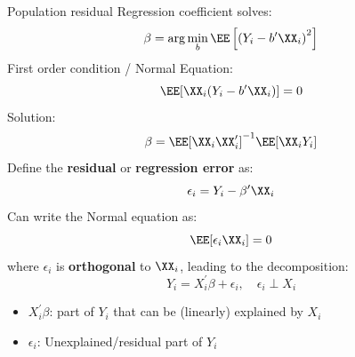 \documentclass[compress, 8pt]{beamer}
\begin{document}
\begin{frame}{Population residual}
Regression coefficient solves:
\begin{equation*}
    \beta = \arg \min_b \EE \left[ \left(Y_i - b^\prime \XX_i\right)^2 \right]
\end{equation*}
First order condition / Normal Equation:
\begin{equation*}
    \EE [\XX_i (Y_i - b^\prime \XX_i)] = 0
\end{equation*}
Solution:
\begin{equation*}
    \beta = \EE [\XX_i \XX_i^\prime]^{-1} \EE [\XX_i Y_i]
\end{equation*}
Define the \textbf{residual} or \textbf{regression error} as:
\begin{equation*}
    \epsilon_i = Y_i - \beta^\prime \XX_i
\end{equation*}
Can write the Normal equation as:
\begin{equation*}
    \EE [ \epsilon_i \XX_i ] = 0
\end{equation*}
where $\epsilon_i$ is \textbf{orthogonal} to $\XX_i$, leading to the decomposition:
\begin{equation*}
    Y_i = X_i^\prime \beta + \epsilon_i, \quad \epsilon_i \perp X_i
\end{equation*}
\begin{itemize}
    \item $X_i^\prime \beta$: part of $Y_i$ that can be (linearly) explained by $X_i$
    \item $\epsilon_i$: Unexplained/residual part of $Y_i$
\end{itemize}


\end{frame}



\end{document}
